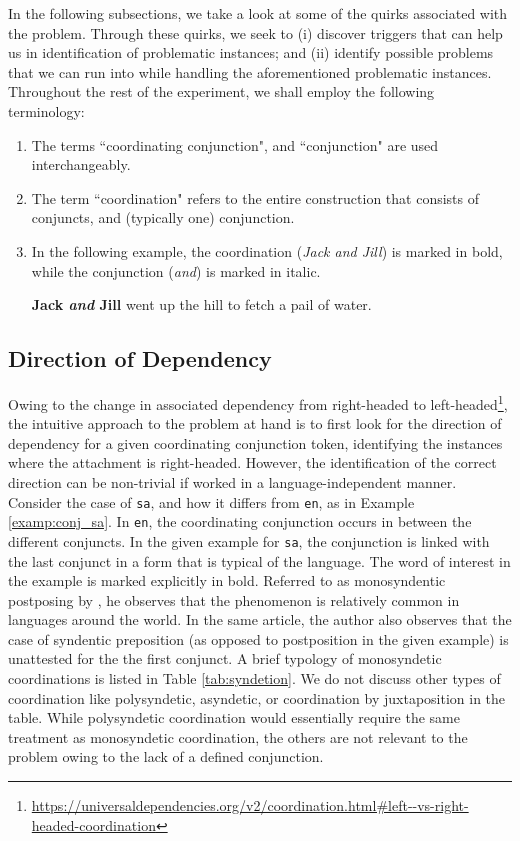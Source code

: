 In the following subsections, we take a look at some of the quirks associated with the problem. Through these quirks, we seek to (i) discover triggers that can help us in identification of problematic instances; and (ii) identify possible problems that we can run into while handling the aforementioned problematic instances. Throughout the rest of the experiment, we shall employ the following terminology:

\begin{enumerate}
    \item The terms ``coordinating conjunction", and ``conjunction" are used interchangeably.
    \item The term ``coordination" refers to the entire construction that consists of conjuncts, and (typically one) conjunction.
    \item In the following example, the coordination (\textit{Jack and Jill}) is marked in bold, while the conjunction (\textit{and}) is marked in italic.
    \begin{example}
    \textbf{Jack \textit{and} Jill} went up the hill to fetch a pail of water.
    \end{example}
\end{enumerate}

\subsection{Direction of Dependency}
\label{sec:direction}

Owing to the change in associated dependency from right-headed to left-headed\footnote{\url{https://universaldependencies.org/v2/coordination.html\#left--vs-right-headed-coordination}}, the intuitive approach to the problem at hand is to first look for the direction of dependency for a given coordinating conjunction token, identifying the instances where the attachment is right-headed. However, the identification of the correct direction can be non-trivial if worked in a language-independent manner. Consider the case of \verb|sa|, and how it differs from \verb|en|, as in Example \ref{examp:conj_sa}. In \verb|en|, the coordinating conjunction occurs in between the different conjuncts. In the given example for \verb|sa|, the conjunction is linked with the last conjunct in a form that is typical of the language. The word of interest in the example is marked explicitly in bold. Referred to as monosyndentic postposing by \cite{stassen}, he observes that the phenomenon is relatively common in languages around the world. In the same article, the author also observes that the case of syndentic preposition (as opposed to postposition in the given example) is unattested for the the first conjunct. A brief typology of monosyndetic coordinations is listed in Table \ref{tab:syndetion}. We do not discuss other types of coordination like polysyndetic, asyndetic, or coordination by juxtaposition in the table. While polysyndetic coordination would essentially require the same treatment as monosyndetic coordination, the others are not relevant to the problem owing to the lack of a defined conjunction.

